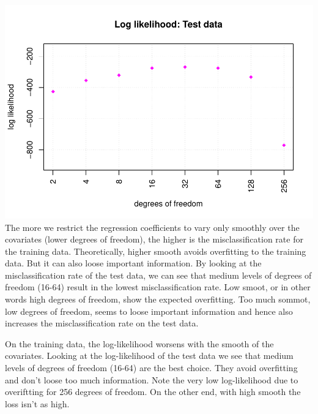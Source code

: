 \documentclass[
]{article}
\begin{document}
\includegraphics{A2_files/figure-latex/unnamed-chunk-16-4.pdf} The more
we restrict the regression coefficients to vary only smoothly over the
covariates (lower degrees of freedom), the higher is the
misclassification rate for the training data. Theoretically, higher
smooth avoids overfitting to the training data. But it can also loose
important information. By looking at the misclassification rate of the
test data, we can see that medium levels of degrees of freedom (16-64)
result in the lowest misclassification rate. Low smoot, or in other
words high degrees of freedom, show the expected overfitting. Too much
sommot, low degrees of freedom, seems to loose important information and
hence also increases the misclassification rate on the test data.

On the training data, the log-likelihood worsens with the smooth of the
covariates. Looking at the log-likelihood of the test data we see that
medium levels of degrees of freedom (16-64) are the best choice. They
avoid overfitting and don't loose too much information. Note the very
low log-likelihood due to overiftting for 256 degrees of freedom. On the
other end, with high smooth the loss isn't as high.
\end{document}
